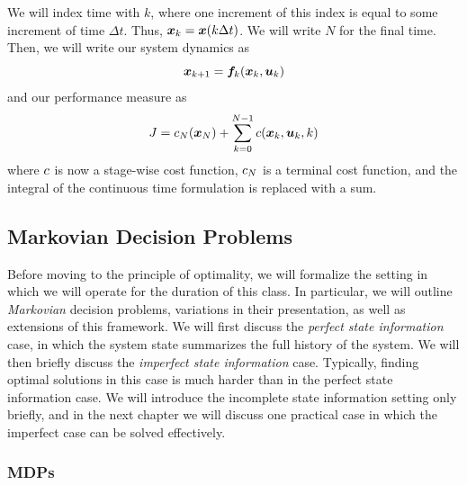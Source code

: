 We will index time with $k$, where one increment of this index is equal to some increment of time $\Delta t$. Thus, $\bm{x}_k = \bm{x}(k \Delta t)$. We will write $N$ for the final time. Then, we will write our system dynamics as 
\begin{equation}
    \bm{x}_{k+1} = \bm{f}_k(\bm{x}_k, \bm{u}_k)
\end{equation}
and our performance measure as 
\begin{equation}
    J = c_N(\bm{x}_N) + \sum_{k=0}^{N-1} c(\bm{x}_k, \bm{u}_k, k)
\end{equation}
where $c$ is now a stage-wise cost function, $c_N$ is a terminal cost function, and the integral of the continuous time formulation is replaced with a sum. 


\subsection{Markovian Decision Problems}

Before moving to the principle of optimality, we will formalize the setting in which we will operate for the duration of this class. In particular, we will outline \textit{Markovian} decision problems, variations in their presentation, as well as extensions of this framework. We will first discuss the \textit{perfect state information} case, in which the system state summarizes the full history of the system. We will then briefly discuss the \textit{imperfect state information} case. Typically, finding optimal solutions in this case is much harder than in the perfect state information case. We will introduce the incomplete state information setting only briefly, and in the next chapter we will discuss one practical case in which the imperfect case can be solved effectively. 

\subsubsection{MDPs}

